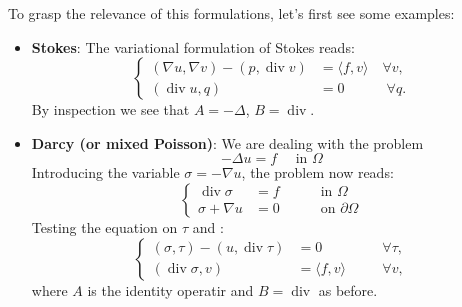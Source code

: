 \documentclass{article}
\DeclareMathOperator{\dive}{\text{div}}
\begin{document}
To grasp the relevance of this formulations, let's first see
some examples:
\begin{itemize}
    \item \textbf{Stokes}: The variational formulation of
    Stokes reads:
    \begin{displaymath}
    \begin{cases}
        (\nabla u, \nabla v) - (p, \dive v)
        &=
        \langle f, v \rangle
        \quad\forall v,
        \\
        (\dive u, q) &= 0 \hspace{3em}\forall q.
    \end{cases}
    \end{displaymath}
    By inspection we see that \(A=-\Delta\), \(B=\dive\).

    \item \textbf{Darcy (or mixed Poisson)}: We are dealing 
    with the problem
    \begin{displaymath}
        -\Delta u = f\quad \text{ in } \Omega
    \end{displaymath}
    Introducing the variable \(\sigma = -\nabla u\), the problem
    now reads:
    \begin{displaymath}
    \left\{
    \begin{aligned}
        \dive \sigma &= f && \quad \text{ in } \Omega\\ 
        \sigma + \nabla u &= 0 && \quad \text{ on } \partial\Omega
    \end{aligned}
    \right.
    \end{displaymath}
    Testing the equation on \(\tau\) and :
    \begin{displaymath}
    \left\{
    \begin{aligned}
        (\sigma, \tau) - (u, \dive \tau) &= 0
        &&\quad\forall \tau, \\ 
        (\dive \sigma, v) &= \langle f,v \rangle
        &&\quad \forall v,
    \end{aligned}
    \right.
    \end{displaymath}
    where $A$ is the identity operatir and $B=\dive$ as before.


\end{itemize}
\end{document}
